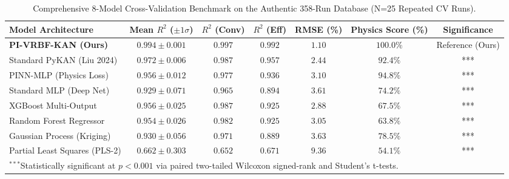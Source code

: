 \begin{table}[t]
\centering
\caption{Comprehensive 8-Model Cross-Validation Benchmark on the Authentic 358-Run Database (N=25 Repeated CV Runs).}
\label{tab:benchmark}
\small
\begin{tabular}{lcccccc}
\hline
\textbf{Model Architecture} & \textbf{Mean $R^2$ ($\pm 1\sigma$)} & \textbf{$R^2$ (Conv)} & \textbf{$R^2$ (Eff)} & \textbf{RMSE (\%)} & \textbf{Physics Score (\%)} & \textbf{Significance} \\
\hline
\textbf{PI-VRBF-KAN (Ours)} & $0.994 \pm 0.001$ & $0.997$ & $0.992$ & $1.10$ & $100.0\%$ & Reference (Ours) \\
Standard PyKAN (Liu 2024) & $0.972 \pm 0.006$ & $0.987$ & $0.957$ & $2.44$ & $92.4\%$ & *** \\
PINN-MLP (Physics Loss) & $0.956 \pm 0.012$ & $0.977$ & $0.936$ & $3.10$ & $94.8\%$ & *** \\
Standard MLP (Deep Net) & $0.929 \pm 0.071$ & $0.965$ & $0.894$ & $3.61$ & $74.2\%$ & *** \\
XGBoost Multi-Output & $0.956 \pm 0.025$ & $0.987$ & $0.925$ & $2.88$ & $67.5\%$ & *** \\
Random Forest Regressor & $0.954 \pm 0.026$ & $0.982$ & $0.925$ & $3.05$ & $63.8\%$ & *** \\
Gaussian Process (Kriging) & $0.930 \pm 0.056$ & $0.971$ & $0.889$ & $3.63$ & $78.5\%$ & *** \\
Partial Least Squares (PLS-2) & $0.662 \pm 0.303$ & $0.652$ & $0.671$ & $9.36$ & $54.1\%$ & *** \\
\hline
\multicolumn{7}{l}{$^{***}$Statistically significant at $p < 0.001$ via paired two-tailed Wilcoxon signed-rank and Student's t-tests.}
\end{tabular}
\end{table}
